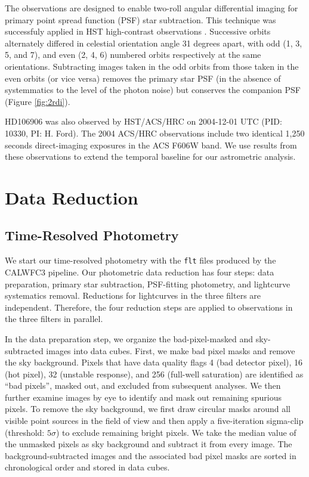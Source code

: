 \documentclass[twocolumn, trackchanges]{aastex62}
\begin{document}
The observations are designed to enable two-roll angular differential imaging for primary point spread function (PSF) star subtraction.  This technique was successfuly applied in HST high-contrast observations \citep[e.g.,][]{Zhou2016,Zhou2019,Paez2019}. {Successive orbits alternately differed in celestial orientation angle 31 degrees apart, with odd (1, 3, 5, and 7), and even (2, 4, 6) numbered orbits respectively at the same orientations.} Subtracting images  taken in the odd orbits from those  taken in the even orbits (or vice versa) removes the primary star PSF (in the absence of systemmatics to the level of the photon noise) but conserves the companion PSF (Figure \ref{fig:2rdi}).  

HD106906 was also observed by HST/ACS/HRC on 2004-12-01 UTC (PID: 10330, PI: H. Ford). The 2004 ACS/HRC observations include two identical 1,250 seconds direct-imaging exposures in the ACS F606W  band. We use results  from these observations \citep{Bailey2013,Kalas2015} to extend the temporal baseline for our astrometric analysis.

\section{Data Reduction}

\subsection{Time-Resolved Photometry}
We start our time-resolved photometry with the \texttt{flt} files produced by the CALWFC3 pipeline. Our photometric data reduction has four steps: data preparation, primary star subtraction, PSF-fitting photometry, and lightcurve systematics removal. Reductions for lightcurves in the three filters are independent. Therefore, the four reduction steps are applied to observations in the three filters in parallel. 

In the data preparation step, we organize the bad-pixel-masked and sky-subtracted images into data cubes. First, we make bad pixel masks and remove the sky background. Pixels that have data quality flags 4 (bad detector pixel), 16 (hot pixel), 32 (unstable response), and 256 (full-well saturation) are identified as ``bad pixels'', masked out, and excluded from subsequent analyses. We then further examine images by eye to identify and mask out remaining spurious pixels. To remove the sky background, we first draw circular masks around all visible point sources in the field of view and then apply a five-iteration  sigma-clip (threshold: $5\sigma$) to exclude remaining bright pixels. We take the median value of the unmasked pixels as sky background and subtract it from every image. The background-subtracted images and the associated bad pixel masks are sorted in chronological order and stored in data cubes.
\end{document}
